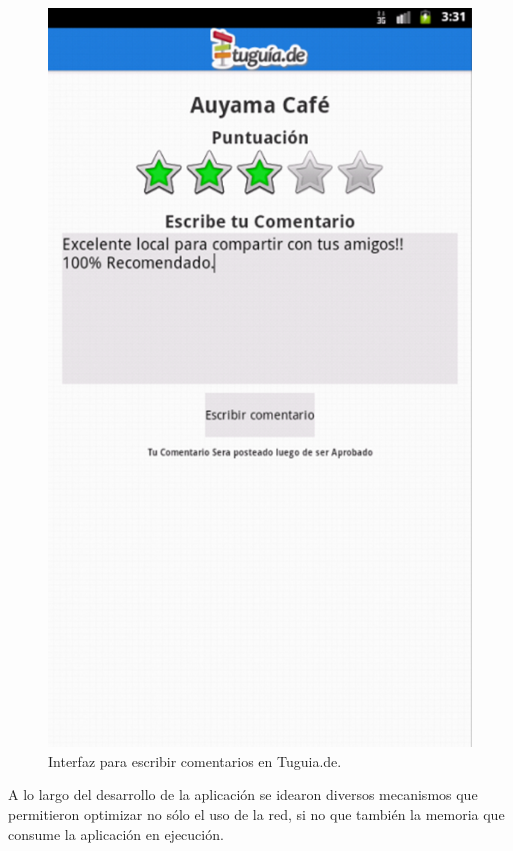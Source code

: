 \begin{figure}[h]
	\begin{center}
		\includegraphics[scale=0.5]{imagenes/escribir_coment.png}
	\end{center}
	\caption{
		\label{img:comentario}
		Interfaz para escribir comentarios en Tuguia.de.
	}
\end{figure}


A lo largo del desarrollo de la aplicación se idearon diversos mecanismos que permitieron optimizar no sólo el uso de la red, si no que también la memoria que consume la aplicación en ejecución.

